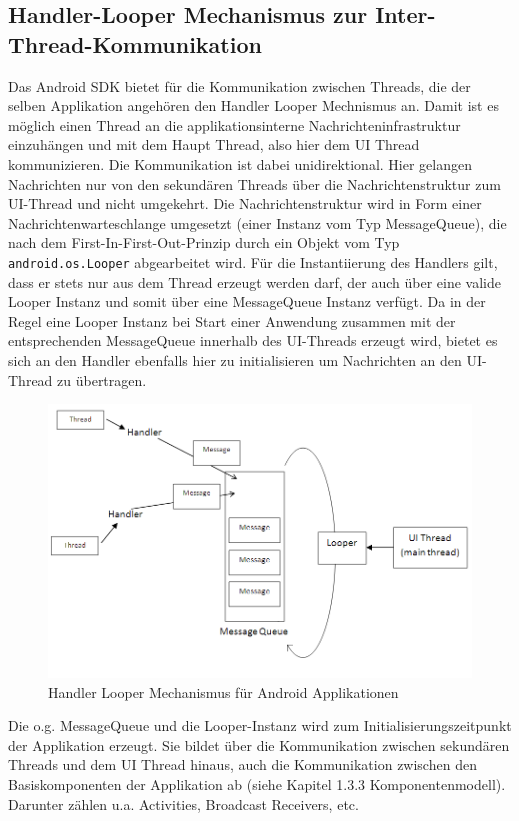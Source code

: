 \documentclass[12pt,oneside,a4paper,bibtotoc,liststotoc]{scrreprt}
\begin{document}
\subsection{Handler-Looper Mechanismus zur Inter-Thread-Kommunikation}
Das Android SDK bietet für die Kommunikation zwischen Threads, die der selben Applikation angehören den Handler Looper Mechnismus an. Damit ist es möglich einen Thread an die applikationsinterne Nachrichteninfrastruktur einzuhängen und mit dem Haupt Thread, also hier dem UI Thread kommunizieren. Die Kommunikation ist dabei unidirektional. Hier gelangen Nachrichten nur von den sekundären Threads über die Nachrichtenstruktur zum UI-Thread und nicht umgekehrt. Die Nachrichtenstruktur wird in Form einer Nachrichtenwarteschlange umgesetzt (einer Instanz vom Typ MessageQueue), die nach dem First-In-First-Out-Prinzip durch ein Objekt vom Typ \texttt{android.os.Looper} abgearbeitet wird. Für die Instantiierung des Handlers gilt, dass er stets nur aus dem Thread erzeugt werden darf, der auch über eine valide Looper Instanz und somit über eine MessageQueue Instanz verfügt. Da in der Regel eine Looper Instanz bei Start einer Anwendung zusammen mit der entsprechenden MessageQueue innerhalb des UI-Threads erzeugt wird, bietet es sich an den Handler ebenfalls hier zu initialisieren um Nachrichten an den UI-Thread zu übertragen.
\begin{figure}[H]
  \begin{centering}
    \includegraphics[width=1\textwidth]{img/handler_looper.png}
    \caption{Handler Looper Mechanismus für Android Applikationen \cite[]{handlerLooperBlock}}
    \label{handler_looper}
  \end{centering}
\end{figure}
Die o.g. MessageQueue und die Looper-Instanz wird zum Initialisierungszeitpunkt der Applikation erzeugt. Sie bildet über die Kommunikation zwischen sekundären Threads und dem UI Thread hinaus, auch die Kommunikation zwischen den Basiskomponenten der Applikation ab (siehe Kapitel 1.3.3 Komponentenmodell). Darunter zählen u.a. Activities, Broadcast Receivers, etc.
\end{document}
